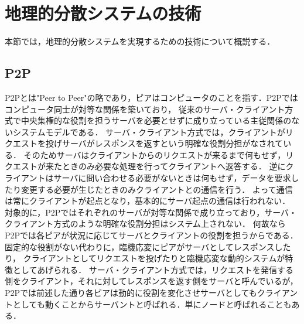 \section{地理的分散システムの技術}
\label{background:geographically-disdtributed-system-technology}
本節では，地理的分散システムを実現するための技術について概説する．

\subsection{P2P}
P2Pとは"Peer to Peer"の略であり，ピアはコンピュータのことを指す．P2Pではコンピュータ同士が対等な関係を築いており，
従来のサーバ・クライアント方式で中央集権的な役割を担うサーバを必要とせずに成り立っている主従関係のないシステムモデルである．
サーバ・クライアント方式では，クライアントがリクエストを投げサーバがレスポンスを返すという明確な役割分担がなされている．
そのためサーバはクライアントからのリクエストが来るまで何もせず，リクエストが来たときのみ必要な処理を行ってクライアントへ返答する．
逆にクライアントはサーバに問い合わせる必要がないときは何もせず，データを要求したり変更する必要が生じたときのみクライアントとの通信を行う．
よって通信は常にクライアントが起点となり，基本的にサーバ起点の通信は行われない．
対象的に，P2Pではそれぞれのサーバが対等な関係で成り立っており，サーバ・クライアント方式のような明確な役割分担はシステム上されない．
何故ならP2Pでは各ピアが状況に応じてサーバとクライアントの役割を担うからである．固定的な役割がない代わりに，臨機応変にピアがサーバとしてレスポンスしたり，
クライアントとしてリクエストを投げたりと臨機応変な動的システムが特徴としてあげられる．
サーバ・クライアント方式では，リクエストを発信する側をクライアント，それに対してレスポンスを返す側をサーバと呼んでいるが，
P2Pでは前述した通り各ピアは動的に役割を変化させサーバとしてもクライアントとしても動くことからサーバントと呼ばれる．単にノードと呼ばれることもある．

